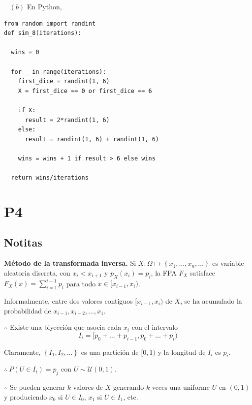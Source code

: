 \documentclass[a4paper, 12pt]{article}
\begin{document}
~ 
$(b)$ En Python,

\begin{verbatim}
from random import randint
def sim_8(iterations):

  wins = 0

  for _ in range(iterations):
    first_dice = randint(1, 6)
    X = first_dice == 0 or first_dice == 6
  
    if X:
      result = 2*randint(1, 6)
    else:
      result = randint(1, 6) + randint(1, 6)

    wins = wins + 1 if result > 6 else wins

  return wins/iterations
\end{verbatim}

\pagebreak 

\section{P4}

\subsection{Notitas}

\begin{myframe}
  \textbf{Método de la transformada inversa.} Si $X : \Omega \mapsto \left\{
  x_1, \ldots, x_n, \ldots \right\} $ es variable aleatoria
  discreta, con $x_i < x_{i+1}$ y $p_X(x_i) = p_i$, la FPA $F_X$ satisface
  $F_X(x) = \sum_{i=1}^{i-1} p_i$ para todo $x \in [x_{i-1}, x_i)$.

  Informalmente, entre dos valores contiguos $[x_{i-1}, x_i)$ de $X$, se ha acumulado
  la probabilidad de $x_{i-1}, x_{i-2}, \ldots, x_1$.

  $\therefore $ Existe una biyección que asocia cada $x_i$ con el intervalo 
  $$I_i = [p_0 + \ldots + p_{i-1}, p_0 + \ldots + p_i)$$

  Claramente, $\left\{ I_1, I_2, \ldots \right\} $ es una partición de $[0, 1)$ 
  y la longitud de $I_i$ es $p_i$. 

  $\therefore ~ P(U \in I_i) = p_j$ con $U \sim \mathcal{U}(0, 1)$.

  $\therefore $ Se pueden generar $k$ valores de $X$ generando $k$ veces una
  uniforme $U$ en $(0, 1)$ y produciendo $x_0$ si $U \in I_0$, $x_1$ si $U \in
  I_1$, etc.
\end{myframe}

\pagebreak 
\end{document}
